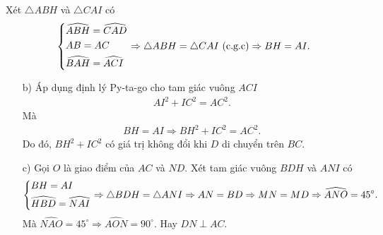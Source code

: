 \begin{bt}
{{
	}
		Xét $ \triangle ABH $ và $ \triangle CAI $ có
		\begin{align*}
			\left\{\begin{aligned}
				& \widehat{ABH} = \widehat{CAD}\\
				& AB = AC\\
				& \widehat{BAH} = \widehat{ACI}
			\end{aligned}\right.
			\Rightarrow \triangle ABH = \triangle CAI \text{ (c.g.c)}
			\Rightarrow BH = AI.
		\end{align*}
		\begin{enumerate}
		\item[b)] Áp dụng định lý Py-ta-go cho tam giác vuông $ ACI $
		\begin{align*}
		AI^2 + IC^2 = AC^2.
		\end{align*}
		Mà
		\begin{align*}
		BH = AI \Rightarrow BH^2 + IC^2 = AC^2.
		\end{align*}
		Do đó, $ BH^2 + IC^2 $ có giá trị không đổi khi $ D $ di chuyển trên $ BC $.
		
		\item[c)] Gọi $ O $ là giao điểm của $ AC $ và $ ND $. Xét tam giác vuông $ BDH $ và $ ANI $ có
		\begin{align*}
		\left\{\begin{aligned}
			& BH = AI\\
			& \widehat{HBD} = \widehat{NAI}
		\end{aligned}\right.
		\Rightarrow \triangle BDH = \triangle ANI
		\Rightarrow AN = BD 
		\Rightarrow MN = MD
		\Rightarrow \widehat{ANO} = 45^\circ.
		\end{align*}
		Mà $ \widehat{NAO} = 45^\circ \Rightarrow \widehat{AON} = 90^\circ $. Hay $ DN \perp AC $.
	\end{enumerate}
	}
\end{bt}

